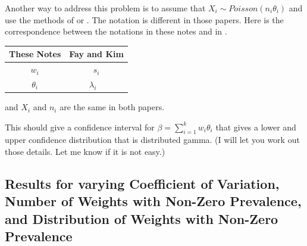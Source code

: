 \documentclass{article}
\begin{document}
Another way to address this problem is to assume that $X_i \sim Poisson( n_i \theta_i)$ and use the methods
of \citet{FayF:1997} or \citet{FayK:2017}.
The notation is different in those papers. Here is the correspondence between the notations in these notes and in \citet{FayK:2017}.

\begin{tabular}{cc}
These Notes & Fay and Kim  \\ \hline
$w_i$     & $s_i$ \\
$\theta_i$ & $\lambda_i$ \
\end{tabular}

and $X_i$ and $n_i$ are the same in both papers. 


This should give a confidence interval for $\beta=\sum_{i=1}^{k} w_i \theta_i$
that gives a lower and upper confidence distribution that is distributed gamma. (I will let you work out those details. Let me know if it is not easy.)

\subsection{Results for varying Coefficient of Variation, Number of Weights with Non-Zero Prevalence, and Distribution of Weights with Non-Zero Prevalence}
\end{document}
